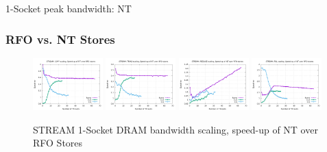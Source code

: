 \documentclass{article}
\begin{document}
\begin{table}[h!]
\centering

\caption{1-Socket peak bandwidth: NT}
\label{table:mem_bw_socket_nt}
\end{table}


\subsubsection{RFO vs. NT Stores}

\begin{figure}[!ht]
    \centering
    \includegraphics[width=0.24\textwidth]{../mem_bw_scale/mb_scale_compact_Copy_nt_rfo}
    \includegraphics[width=0.24\textwidth]{../mem_bw_scale/mb_scale_compact_Triad_nt_rfo}
    \includegraphics[width=0.24\textwidth]{../mem_bw_scale/mb_scale_compact_Reduce_nt_rfo}
    \includegraphics[width=0.24\textwidth]{../mem_bw_scale/mb_scale_compact_Fill_nt_rfo}
    \caption{STREAM 1-Socket DRAM bandwidth scaling, speed-up of NT over RFO Stores}
    \label{figure:mem_bw_scale_compact_nt_rfo}
\end{figure}
\end{document}
